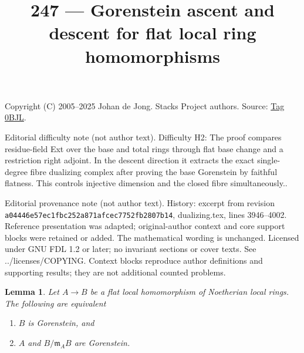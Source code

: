 \documentclass{amsart}
\theoremstyle{plain}
\newtheorem{lemma}[subsection]{Lemma}
\theoremstyle{definition}
\theoremstyle{remark}
\numberwithin{equation}{subsection}
\begin{document}
\title[Stacks Project, Tag 0BJL]{247 --- Gorenstein ascent and descent for flat local ring homomorphisms}
\maketitle
\noindent Copyright (C) 2005--2025 Johan de Jong. Stacks Project authors. Source: \href{https://stacks.math.columbia.edu/tag/0BJL}{Tag 0BJL}.

\noindent Editorial difficulty note (not author text). Difficulty H2: The proof compares residue-field Ext over the base and total rings through flat base change and a restriction right adjoint. In the descent direction it extracts the exact single-degree fibre dualizing complex after proving the base Gorenstein by faithful flatness. This controls injective dimension and the closed fibre simultaneously..

\noindent Editorial provenance note (not author text). History: excerpt from revision \texttt{a0444\allowbreak 6e57e\allowbreak c1fbc\allowbreak 252a8\allowbreak 71afc\allowbreak ec775\allowbreak 2fb28\allowbreak 07b14}, dualizing.tex, lines 3946--4002. Reference presentation was adapted; original-author context and core support blocks were retained or added. The mathematical wording is unchanged. Licensed under GNU FDL 1.2 or later; no invariant sections or cover texts. See ../licenses/COPYING. Context blocks reproduce author definitions and supporting results; they are not additional counted problems.

\begin{lemma}
\label{lemma-flat-under-gorenstein}
Let $A \to B$ be a flat local homomorphism of Noetherian local rings.
The following are equivalent
\begin{enumerate}
\item $B$ is Gorenstein, and
\item $A$ and $B/\mathfrak m_A B$ are Gorenstein.
\end{enumerate}
\end{lemma}
\end{document}
